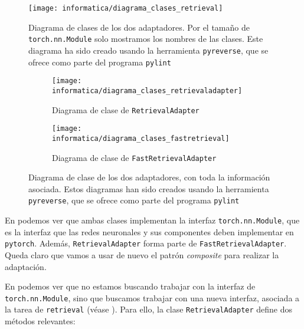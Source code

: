 \begin{figure}[H]
    \centering
    \texttt{[image: informatica/diagrama\_clases\_retrieval]}
    \caption{Diagrama de clases de los dos adaptadores. Por el tamaño de \lstinline{torch.nn.Module} solo mostramos los nombres de las clases. Este diagrama ha sido creado usando la herramienta \lstinline{pyreverse}, que se ofrece como parte del programa \lstinline{pylint}}
    \label{img:diagrama_clases_global_adaptadores}
\end{figure}

\begin{figure}[H]
\centering
    \begin{subfigure}{.6\textwidth}
        \centering
        \texttt{[image: informatica/diagrama\_clases\_retrievaladapter]}
        \caption{Diagrama de clase de \lstinline{RetrievalAdapter}}
    \end{subfigure}%
    \begin{subfigure}{.4\textwidth}
        \centering
        \texttt{[image: informatica/diagrama\_clases\_fastretrieval]}
        \caption{Diagrama de clase de \lstinline{FastRetrievalAdapter}}
    \end{subfigure}
\caption{Diagrama de clase de los dos adaptadores, con toda la información asociada. Estos diagramas han sido creados usando la herramienta \lstinline{pyreverse}, que se ofrece como parte del programa \lstinline{pylint}}
\label{img:diagramas_clase_concretos_adaptadores}
\end{figure}

En  podemos ver que ambas clases implementan la interfaz \lstinline{torch.nn.Module}, que es la interfaz que las redes neuronales y sus componentes deben implementar en \lstinline{pytorch}. Además, \lstinline{RetrievalAdapter} forma parte de \lstinline{FastRetrievalAdapter}. Queda claro que vamos a usar de nuevo el patrón \textit{composite} para realizar la adaptación.

En  podemos ver que no estamos buscando trabajar con la interfaz de \lstinline{torch.nn.Module}, sino que buscamos trabajar con una nueva interfaz, asociada a la tarea de \lstinline{retrieval} (véase ). Para ello, la clase \lstinline{RetrievalAdapter} define dos métodos relevantes:

